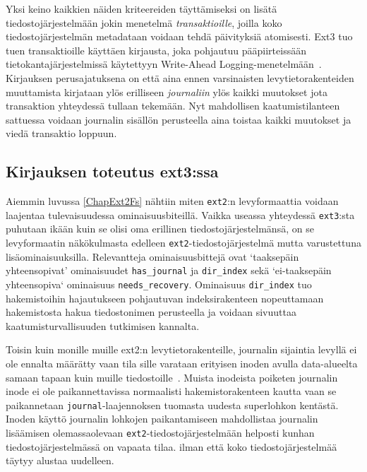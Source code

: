 Yksi keino kaikkien näiden kriteereiden täyttämiseksi on lisätä tiedostojärjestelmään jokin menetelmä \emph{transaktioille}, joilla koko tiedostojärjestelmän metadataan voidaan tehdä päivityksiä atomisesti.
Ext3 tuo tuen transaktioille käyttäen kirjausta, joka pohjautuu pääpiirteissään tietokantajärjestelmissä käytettyyn Write-Ahead Logging-menetelmään~\cite{AriesWal}.
Kirjauksen perusajatuksena on että aina ennen varsinaisten levytietorakenteiden muuttamista kirjataan ylös erilliseen \emph{journaliin} ylös kaikki muutokset jota transaktion yhteydessä tullaan tekemään.
Nyt mahdollisen kaatumistilanteen sattuessa voidaan journalin sisällön perusteella aina toistaa kaikki muutokset ja viedä transaktio loppuun.

%

\subsection{Kirjauksen toteutus ext3:ssa}
Aiemmin luvussa \ref{ChapExt2Fs} nähtiin miten \texttt{ext2}:n levyformaattia voidaan laajentaa tulevaisuudessa ominaisuusbiteillä.
Vaikka useassa yhteydessä \texttt{ext3}:sta puhutaan ikään kuin se olisi oma erillinen tiedostojärjestelmänsä,
on se levyformaatin näkökulmasta edelleen \texttt{ext2}-tiedostojärjestelmä mutta varustettuna lisäominaisuuksilla.
Relevantteja ominaisuusbittejä ovat `taaksepäin yhteensopivat' ominaisuudet \texttt{has\_journal} ja \texttt{dir\_index} sekä `ei-taaksepäin yhteensopiva` ominaisuus \texttt{needs\_recovery}.
Ominaisuus \texttt{dir\_index} tuo hakemistoihin hajautukseen pohjautuvan indeksirakenteen nopeuttamaan hakemistosta hakua tiedostonimen perusteella ja voidaan sivuuttaa kaatumisturvallisuuden tutkimisen kannalta.

Toisin kuin monille muille ext2:n levytietorakenteille, journalin sijaintia levyllä ei ole ennalta määrätty vaan tila sille varataan erityisen inoden avulla data-alueelta samaan tapaan kuin muille tiedostoille~\cite{Ext2Journal}.
Muista inodeista poiketen journalin inode ei ole paikannettavissa normaalisti hakemistorakenteen kautta vaan se paikannetaan \texttt{journal}-laajennoksen tuomasta uudesta superlohkon kentästä.
Inoden käyttö journalin lohkojen paikantamiseen mahdollistaa journalin lisäämisen olemassaolevaan \texttt{ext2}-tiedostojärjestelmään helposti kunhan tiedostojärjestelmässä on vapaata tilaa.
ilman että koko tiedostojärjestelmää täytyy alustaa uudelleen.


